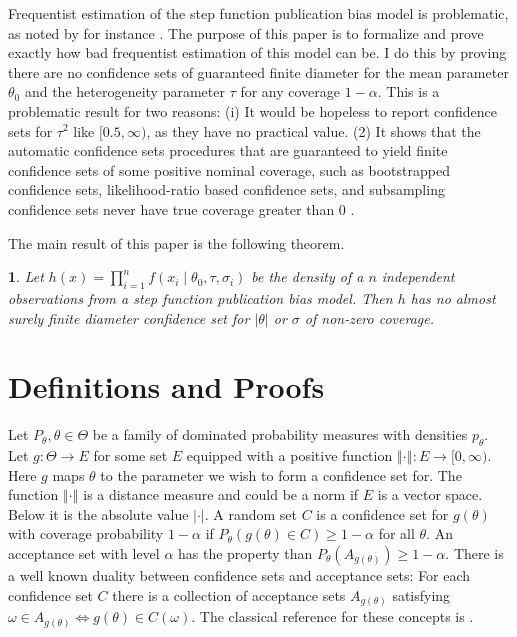 \documentclass{article}
\theoremstyle{plain}
\newtheorem{thm}{\protect\theoremname}
\theoremstyle{plain}
\theoremstyle{definition}
\theoremstyle{remark}
\theoremstyle{definition}
\theoremstyle{plain}
\theoremstyle{plain}
\theoremstyle{definition}
\providecommand{\theoremname}{Theorem}
\begin{document}
Frequentist estimation of the step function publication bias model
is problematic, as noted by for instance \citet[appendix, 1]{mcshane2016adjusting}.
The purpose of this paper is to formalize and prove exactly how bad frequentist estimation of this model can be. I do this by proving there are no confidence sets of guaranteed finite diameter for the mean parameter $\theta_{0}$
and the heterogeneity parameter $\tau$ for any coverage $1-\alpha$.
This is a problematic result for two reasons: (i) It would be hopeless
to report confidence sets for $\tau^{2}$ like $[0.5,\infty)$,
as they have no practical value. (2) It shows that the automatic confidence
sets procedures that are guaranteed to yield finite confidence sets
of some positive nominal coverage, such as bootstrapped confidence
sets, likelihood-ratio based confidence sets, and subsampling confidence
sets never have true coverage greater than $0$ \citep[see][]{gleser996bootstrap}.

The main result of this paper is the following theorem.
\begin{thm}
\label{prop:p-hacking infinite confidence interval}Let $h(x)=\prod_{i=1}^{n}f(x_{i}\mid\theta_{0},\tau,\sigma_{i})$
be the density of a $n$ independent observations from a step function
publication bias model. Then $h$ has no almost surely finite diameter
confidence set for $\left|\theta\right|$ or $\sigma$ of non-zero
coverage.
\end{thm}

\section{Definitions and Proofs}

Let $P_{\theta},\theta\in\Theta$ be a family of dominated probability
measures with densities $p_{\theta}$. Let $g:\Theta\to E$ for some
set $E$ equipped with a positive function $\left\Vert \cdot\right\Vert :E\to[0,\infty)$.
Here $g$ maps $\theta$ to the parameter we wish to form a confidence
set for. The function $\left\Vert \cdot\right\Vert $ is a distance
measure and could be a norm if $E$ is a vector space. Below it is the
absolute value $\left|\cdot\right|$. A random set $C$ is a confidence
set for $g(\theta)$ with coverage probability $1-\alpha$
if $P_{\theta}(g(\theta)\in C)\geq1-\alpha$
for all $\theta$. An\emph{ }acceptance set with level $\alpha$ has
the property than $P_{\theta}(A_{g(\theta)})\geq1-\alpha$.
There is a well known duality between confidence sets and acceptance
sets: For each confidence set $C$ there is a collection of acceptance
sets $A_{g(\theta)}$ satisfying $\omega\in A_{g(\theta)}\iff g(\theta)\in C(\omega)$.
The classical reference for these concepts is \citep[chapter 3.5]{lehmann2006testing}.
\end{document}
